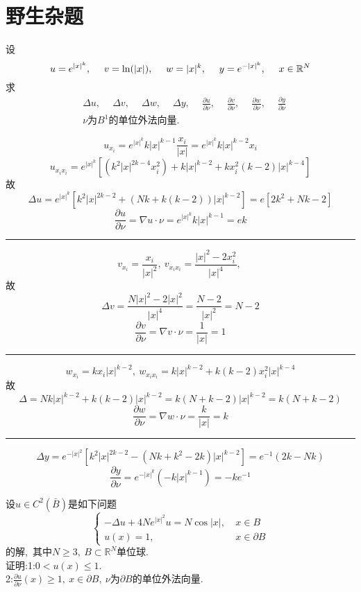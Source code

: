 	\section{野生杂题}
	\begin{lemma}
		设$$u=e^{|x|^k},\ \quad v=\ln(|x|),\ \quad w=|x|^k,\ \quad  y=e^{-|x|^k},\ \quad x\in\mathbb{R}^N\\$$求
		\begin{align*}
			&\Delta u,\ \quad\Delta v,\ \quad \Delta w,\ \quad \Delta y,\ \quad\frac{\partial u}{\partial\nu},\ \quad \frac{\partial v}{\partial \nu},\ \quad \frac{\partial w}{\partial \nu},\ \quad\frac{\partial y}{\partial \nu}\\
			&\nu\text{为$B^1$的单位外法向量}.
		\end{align*}
	\end{lemma}	
	\begin{solution}
		$$u_{x_i}=e^{|x|^{k}}k|x|^{k-1}\frac{x_i}{|x|}=e^{|x|^k}k|x|^{k-2}x_i$$
		$$u_{x_ix_i}=e^{|x|^k}[(k^2|x|^{2k-4}x^2_i)+k|x|^{k-2}+kx^2_i(k-2)|x|^{k-4}]$$
		故
		$$\Delta u=e^{|x|^k}[k^2|x|^{2k-2}+(Nk+k(k-2))|x|^{k-2}]=e[2k^2+Nk-2]$$
		$$\frac{\partial u}{\partial \nu}=\nabla u\cdot\nu=e^{|x|^k}k|x|^{k-1}=ek$$
		{\noindent} \rule[0pt]{12cm}{0.05em}
		$$v_{x_i}=\frac{x_i}{|x|^2},\ v_{x_ix_i}=\frac{|x|^2-2x^2_i}{|x|^4},\ $$
		故
		$$\Delta v=\frac{N|x|^2-2|x|^2}{|x|^4}=\frac{N-2}{|x|^2}=N-2$$
		$$\frac{\partial v}{\partial \nu}=\nabla v\cdot \nu=\frac{1}{|x|}=1$$
		{\noindent} \rule[0pt]{12cm}{0.05em}
		$$w_{x_i}=kx_i|x|^{k-2},\ w_{x_ix_i}=k|x|^{k-2}+k(k-2)x^2_i|x|^{k-4}$$
		故
		$$\Delta=Nk|x|^{k-2}+k(k-2)|x|^{k-2}=k(N+k-2)|x|^{k-2}=k(N+k-2)$$
		$$\frac{\partial w}{\partial \nu}=\nabla w\cdot \nu =\frac{k}{|x|}=k$$
		{\noindent} \rule[0pt]{12cm}{0.05em}
		$$\Delta y=e^{-|x|^2}[k^2|x|^{2k-2}-(Nk+k^2-2k)|x|^{k-2}]=e^{-1}(2k-Nk)$$
		$$\frac{\partial y}{\partial \nu}=e^{-|x|^k}(-k|x|^{k-1})=-ke^{-1}$$
	\end{solution}
	\newpage
	\begin{problem}
		设$u\in C^2(\bar{B})$是如下问题
		$$\begin{cases}
			-\Delta u+4Ne^{|x|^2}u=N\cos|x|,\ &x\in B\\
			u(x)=1,\ &x\in\partial B
		\end{cases}$$
		的解,\ 其中$N\geqslant 3,\ B\subset \mathbb{R}^N$单位球.\\
		证明:1:$0<u(x)\leqslant 1.$\\
		2:$\frac{\partial u}{\partial \nu}(x)\geqslant 1,\ x\in\partial B,\ \nu$为$\partial B$的单位外法向量.
	\end{problem}

